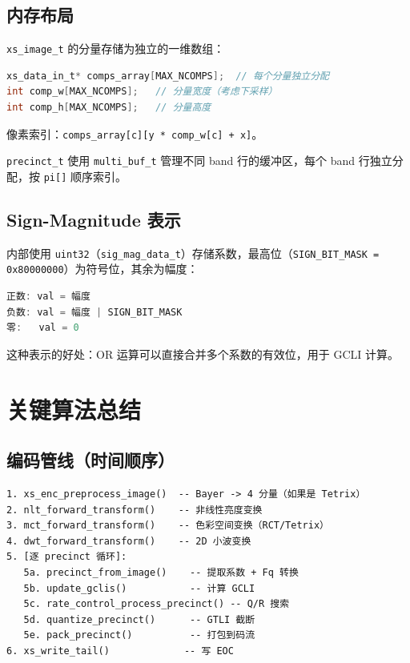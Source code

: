 \subsection{内存布局}

\texttt{xs\_image\_t} 的分量存储为独立的一维数组：

\begin{lstlisting}[language=C,numbers=none]
xs_data_in_t* comps_array[MAX_NCOMPS];  // 每个分量独立分配
int comp_w[MAX_NCOMPS];   // 分量宽度（考虑下采样）
int comp_h[MAX_NCOMPS];   // 分量高度
\end{lstlisting}

像素索引：\texttt{comps\_array[c][y * comp\_w[c] + x]}。

\texttt{precinct\_t} 使用 \texttt{multi\_buf\_t} 管理不同 band 行的缓冲区，每个 band 行独立分配，按 \texttt{pi[]} 顺序索引。

\subsection{Sign-Magnitude 表示}

内部使用 \texttt{uint32}（\texttt{sig\_mag\_data\_t}）存储系数，最高位（\texttt{SIGN\_BIT\_MASK = 0x80000000}）为符号位，其余为幅度：

\begin{lstlisting}[language=C,numbers=none]
正数: val = 幅度
负数: val = 幅度 | SIGN_BIT_MASK
零:   val = 0
\end{lstlisting}

这种表示的好处：OR 运算可以直接合并多个系数的有效位，用于 GCLI 计算。

\section{关键算法总结}

\subsection{编码管线（时间顺序）}

\begin{lstlisting}[numbers=none]
1. xs_enc_preprocess_image()  -- Bayer -> 4 分量（如果是 Tetrix）
2. nlt_forward_transform()    -- 非线性亮度变换
3. mct_forward_transform()    -- 色彩空间变换（RCT/Tetrix）
4. dwt_forward_transform()    -- 2D 小波变换
5. [逐 precinct 循环]:
   5a. precinct_from_image()    -- 提取系数 + Fq 转换
   5b. update_gclis()           -- 计算 GCLI
   5c. rate_control_process_precinct() -- Q/R 搜索
   5d. quantize_precinct()      -- GTLI 截断
   5e. pack_precinct()          -- 打包到码流
6. xs_write_tail()             -- 写 EOC
\end{lstlisting}

